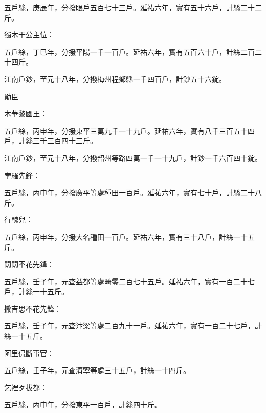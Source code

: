\begin{pinyinscope}
 五戶絲，庚辰年，分撥眼戶五百七十三戶。延祐六年，實有五十六戶，計絲二十二斤。



 獨木干公主位：



 五戶絲，丁巳年，分撥平陽一千一百戶。延祐六年，實有五百六十戶，計絲二百二十四斤。



 江南戶鈔，至元十八年，分撥梅州程鄉縣一千四百戶，計鈔五十六錠。



 勛臣



 木華黎國王：



 五戶絲，丙申年，分撥東平三萬九千一十九戶。延祐六年，實有八千三百五十四戶，計絲三千三百四十三斤。



 江南戶鈔，至元十八年，分撥韶州等路四萬一千一十九戶，計鈔一千六百四十錠。



 孛羅先鋒：



 五戶絲，丙申年，分撥廣平等處種田一百戶。延祐六年，實有七十戶，計絲二十八斤。



 行醜兒：



 五戶絲，丙申年，分撥大名種田一百戶。延祐六年，實有三十八戶，計絲一十五斤。



 闊闊不花先鋒：



 五戶絲，壬子年，元查益都等處畸零二百七十五戶。延祐六年，實有一百二十七戶，計絲一十五斤。



 撒吉思不花先鋒：



 五戶絲，壬子年，元查汴梁等處二百九十一戶。延祐六年，實有一百二十七戶，計絲一十五斤。



 阿里侃斷事官：



 五戶絲，壬子年，元查濟寧等處三十五戶，計絲一十四斤。



 乞裡歹拔都：



 五戶絲，丙申年，分撥東平一百戶，計絲四十斤。




\end{pinyinscope}
